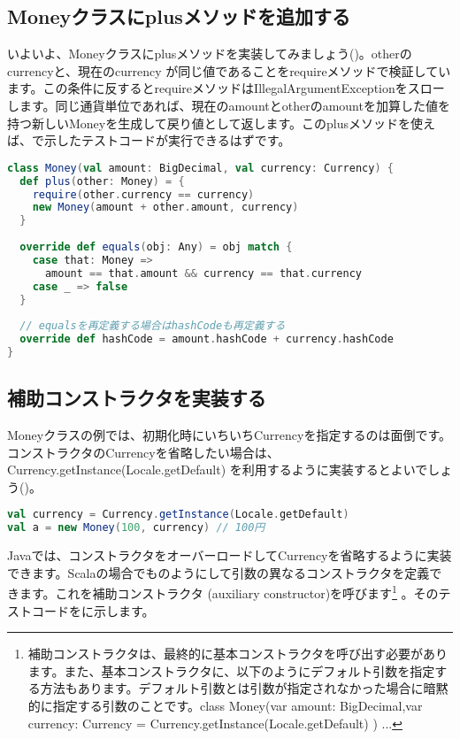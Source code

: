 \subsection{Moneyクラスにplusメソッドを追加する}
いよいよ、Moneyクラスにplusメソッドを実装してみましょう()。otherのcurrencyと、現在のcurrency が同じ値であることをrequireメソッドで検証しています。この条件に反するとrequireメソッドはIllegalArgumentExceptionをスローします。同じ通貨単位であれば、現在のamountとotherのamountを加算した値を持つ新しいMoneyを生成して戻り値として返します。このplusメソッドを使えば、で示したテストコードが実行できるはずです。 

\begin{lstlisting}[language=scala, label=src:money_plus, caption=plusメソッドを実装したMoneyクラス]
class Money(val amount: BigDecimal, val currency: Currency) {
  def plus(other: Money) = {
    require(other.currency == currency)
    new Money(amount + other.amount, currency)
  }
   
  override def equals(obj: Any) = obj match {
    case that: Money =>
      amount == that.amount && currency == that.currency
    case _ => false
  }
   
  // equalsを再定義する場合はhashCodeも再定義する
  override def hashCode = amount.hashCode + currency.hashCode
} 
\end{lstlisting}

\subsection{補助コンストラクタを実装する}
Moneyクラスの例では、初期化時にいちいちCurrencyを指定するのは面倒です。コンストラクタのCurrencyを省略したい場合は、Currency.getInstance(Locale.getDefault) を利用するように実装するとよいでしょう()。 

\begin{lstlisting}[language=scala, label=src:locale_default, caption=ほとんどの場合で次のようにして円の通貨単位を扱える]
val currency = Currency.getInstance(Locale.getDefault)
val a = new Money(100, currency) // 100円 
\end{lstlisting}

Javaでは、コンストラクタをオーバーロードしてCurrencyを省略するように実装できます。Scalaの場合でものようにして引数の異なるコンストラクタを定義できます。これを補助コンストラクタ (auxiliary constructor)を呼びます\footnote{補助コンストラクタは、最終的に基本コンストラクタを呼び出す必要があります。また、基本コンストラクタに、以下のようにデフォルト引数を指定する方法もあります。デフォルト引数とは引数が指定されなかった場合に暗黙的に指定する引数のことです。class Money(var amount: BigDecimal,var currency: Currency = Currency.getInstance(Locale.getDefault) ) ...} 。そのテストコードをに示します。

